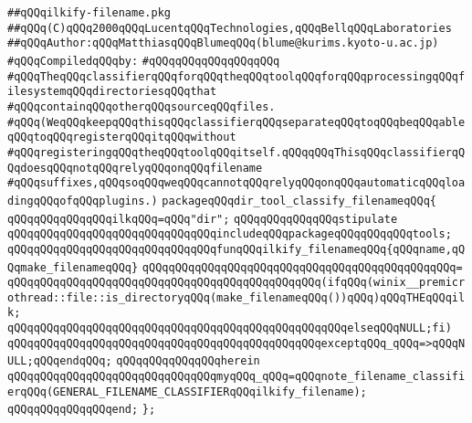 \label{src/app/makelib/tools/dir/ilkify-filename.pkg}
\verb|##qQQqilkify-filename.pkg|\newline
\verb|##qQQq(C)qQQq2000qQQqLucentqQQqTechnologies,qQQqBellqQQqLaboratories|\newline
\verb|##qQQqAuthor:qQQqMatthiasqQQqBlumeqQQq(blume@kurims.kyoto-u.ac.jp)|\newline
\newline
\verb|#qQQqCompiledqQQqby:|\newline
\verb|#qQQqqQQqqQQqqQQqqQQq|\newline
\newline
\newline
\newline
\verb|#qQQqTheqQQqclassifierqQQqforqQQqtheqQQqtoolqQQqforqQQqprocessingqQQqfilesystemqQQqdirectoriesqQQqthat|\newline
\verb|#qQQqcontainqQQqotherqQQqsourceqQQqfiles.|\newline
\verb|#qQQq(WeqQQqkeepqQQqthisqQQqclassifierqQQqseparateqQQqtoqQQqbeqQQqableqQQqtoqQQqregisterqQQqitqQQqwithout|\newline
\verb|#qQQqregisteringqQQqtheqQQqtoolqQQqitself.qQQqqQQqThisqQQqclassifierqQQqdoesqQQqnotqQQqrelyqQQqonqQQqfilename|\newline
\verb|#qQQqsuffixes,qQQqsoqQQqweqQQqcannotqQQqrelyqQQqonqQQqautomaticqQQqloadingqQQqofqQQqplugins.)|\newline
\newline
\newline
\newline
\verb|packageqQQqdir_tool_classify_filenameqQQq{|\newline
\newline
\verb|qQQqqQQqqQQqqQQqilkqQQq=qQQq"dir";|\newline
\verb|qQQqqQQqqQQqqQQqstipulate|\newline
\verb|qQQqqQQqqQQqqQQqqQQqqQQqqQQqqQQqincludeqQQqpackageqQQqqQQqqQQqtools;|\newline
\newline
\verb|qQQqqQQqqQQqqQQqqQQqqQQqqQQqqQQqfunqQQqilkify_filenameqQQq{qQQqname,qQQqmake_filenameqQQq}|\newline
\verb|qQQqqQQqqQQqqQQqqQQqqQQqqQQqqQQqqQQqqQQqqQQqqQQq=|\newline
\verb|qQQqqQQqqQQqqQQqqQQqqQQqqQQqqQQqqQQqqQQqqQQqqQQq(ifqQQq(winix__premicrothread::file::is_directoryqQQq(make_filenameqQQq())qQQq)qQQqTHEqQQqilk;|\newline
\verb|qQQqqQQqqQQqqQQqqQQqqQQqqQQqqQQqqQQqqQQqqQQqqQQqqQQqelseqQQqNULL;fi)|\newline
\verb|qQQqqQQqqQQqqQQqqQQqqQQqqQQqqQQqqQQqqQQqqQQqqQQqexceptqQQq_qQQq=>qQQqNULL;qQQqendqQQq;|\newline
\verb|qQQqqQQqqQQqqQQqherein|\newline
\verb|qQQqqQQqqQQqqQQqqQQqqQQqqQQqqQQqmyqQQq_qQQq=qQQqnote_filename_classifierqQQq(GENERAL_FILENAME_CLASSIFIERqQQqilkify_filename);|\newline
\verb|qQQqqQQqqQQqqQQqend;|\newline
\verb|};|\newline

